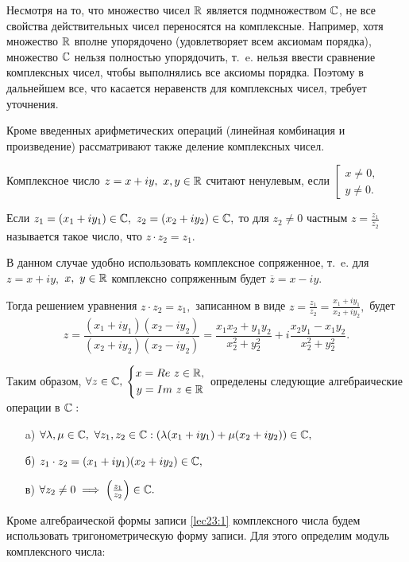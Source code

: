 \documentclass[../../main.tex]{subfiles}
\begin{document}
	Несмотря на то, что множество чисел $\mathbb{R}$ является подмножеством $\mathbb{C}$, не все
	свойства действительных чисел переносятся на комплексные. Например, хотя
	множество $\mathbb{R}$ вполне упорядочено (удовлетворяет всем аксиомам порядка),
	множество $\mathbb{C}$ нельзя полностью упорядочить, т.~e. нельзя ввести сравнение
	комплексных чисел, чтобы выполнялись все аксиомы порядка. Поэтому в 
	дальнейшем все, что касается неравенств для комплексных чисел, требует
	уточнения.
	
	Кроме введенных арифметических операций (линейная комбинация и произведение)
	рассматривают также деление комплексных чисел.
	
	Комплексное число $z = x + iy,\ x, y\in\mathbb{R}$ считают ненулевым, если 
	$\left[
	\begin{gathered} 
		x \neq  0, \\
		y \neq  0. 
	\end{gathered} \right.$
	
	Если $z_1 = (x_1 + iy_1)\in \mathbb{C},\ z_2 = (x_2 + iy_2)\in\mathbb{C},$ то для 
	$z_2 \neq 0$ частным $z = \frac{z_1}{z_2}$ называется такое число,
	что $z\cdot z_2 = z_1.$
	
	В данном случае удобно использовать комплексное сопряженное, т.~e. для
	$z = x +iy,$ $x,\ y\in\mathbb{R}$ комплексно сопряженным будет 
	$\overline{z} = x - iy.$
	
	Тогда решением уравнения $z\cdot z_2 = z_1,$ записанном в виде 
	$z = \frac{z_1}{z_2} = \frac{x_1 + iy_1}{x_2 + iy_2},$ будет
	\[z = \frac{(x_1 + iy_1)(x_2 - iy_2)}{(x_2 + iy_2)(x_2 - iy_2)} =
	\frac{x_1x_2+y_1y_2}{x_2^2 + y_2^2} + i  
	\frac{x_2y_1-x_1y_2}{x_2^2 + y_2^2}.\]
	
	Таким образом, $\forall z\in \mathbb{C},$ 
	$\left\{
	\begin{gathered} 
	x = Re\ z \in \mathbb{R},\\
	 y = Im\ z \in \mathbb{R}
	\end{gathered}\right.$ определены следующие алгебраические операции в $\mathbb{C}:$
	\begin{itemize}
		\item[a)] $\forall \lambda, \mu\in\mathbb{C},\ \forall z_1, z_2\in\mathbb{C}:
		(\lambda(x_1+iy_1)+\mu(x_2+iy_2)) \in\mathbb{C},$
		\item[б)] $z_1\cdot z_2 = (x_1+iy_1)(x_2+iy_2) \in\mathbb{C},$
		\item[в)] $\forall z_2 \neq 0 \implies \left(\frac{z_1}{z_2}\right)
		\in \mathbb{C}.$
	\end{itemize}
	
	Кроме алгебраической формы записи \eqref{lec23:1} комплексного числа будем
	использовать тригонометрическую форму записи. Для этого определим модуль 
	комплексного числа:
	
\end{document}
